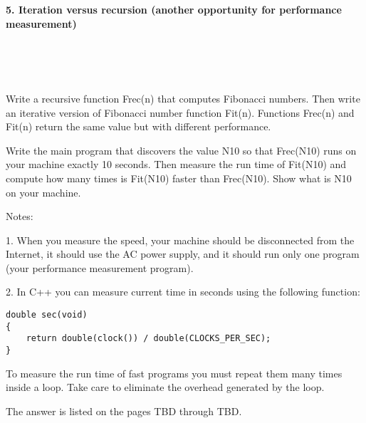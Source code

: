 \documentclass{article}
\begin{document}
\paragraph{}\
\paragraph{}\

	
	\rmfamily
	
	\paragraph{5. Iteration versus recursion (another opportunity for performance measurement) }\
	
	\rmfamily\
	
		Write a recursive function Frec(n) that computes Fibonacci numbers. Then write an iterative version of Fibonacci number function Fit(n). Functions Frec(n) and Fit(n) return the same value but with different performance.
		\newline
		
		Write the main program that discovers the value N10 so that Frec(N10) runs on your machine exactly 10 seconds. Then measure the run time of Fit(N10) and compute how many times is Fit(N10) faster than Frec(N10). Show what is N10 on your machine.
		\newline
		
		\noindent Notes:
		
		1. When you measure the speed, your machine should be disconnected from the Internet, it should use the AC power supply, and it should run only one program (your performance measurement program).
		
		2. In C++ you can measure current time in seconds using the following function:
		
		\begin{verbatim}
double sec(void)
{
    return double(clock()) / double(CLOCKS_PER_SEC);
}
		\end{verbatim}
		
		To measure the run time of fast programs you must repeat them many times inside a loop. Take care to eliminate the overhead generated by the loop.
		\newline
		
		The answer is listed on the pages TBD through TBD.
	
	



	
\end{document}
